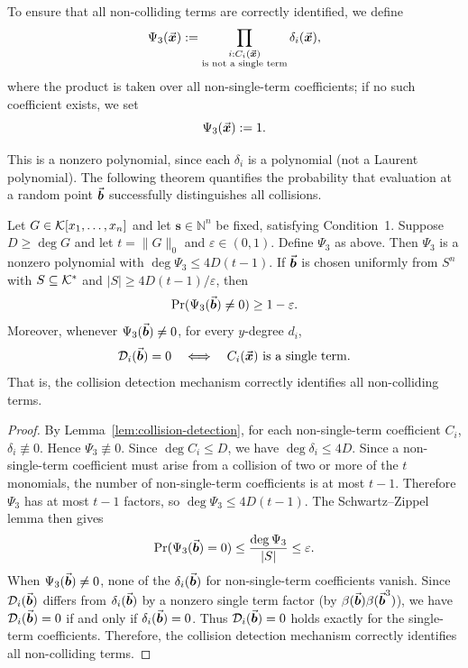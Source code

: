 \documentclass{article}
\numberwithin{equation}{section}
\begin{document}
To ensure that all non-colliding terms are correctly identified, we define
\[
\Psi_3(\vec{\boldsymbol{x}}):=
\prod_{\substack{i : C_i(\vec{\boldsymbol{x}}) \\ \text{is not a single term}}} \delta_i(\vec{\boldsymbol{x}}),
\]
where the product is taken over all non-single-term coefficients; if no such coefficient exists, we set $$\Psi_3(\vec{\boldsymbol{x}}) := 1.$$

This is a nonzero polynomial, since each $\delta_i$ is a polynomial (not a Laurent polynomial). The following theorem quantifies the probability that evaluation at a random point $\vec{\boldsymbol{b}}$ successfully distinguishes all collisions.

\begin{theorem}\label{thm:b-condition3}
Let $G \in {\mathcal{K}}[x_1, \dots, x_n]$ and let $\mathbf{s} \in \mathbb{N}^n$ be fixed, satisfying Condition~1. Suppose $D \ge \deg G$ and let $t = \|G\|_0$ and $\varepsilon\in(0,1)$. Define $\Psi_3$ as above. Then $\Psi_3$ is a nonzero polynomial with $\deg \Psi_3 \le 4 D (t-1)$. If $\vec{\boldsymbol{b}}$ is chosen uniformly from $S^n$ with $S \subseteq {\mathcal{K}}^*$ and $|S| \ge 4 D (t-1) / \varepsilon$, then
\[
\Pr(\Psi_3(\vec{\boldsymbol{b}}) \neq 0) \ge 1 - \varepsilon.
\]
Moreover, whenever $\Psi_3(\vec{\boldsymbol{b}}) \neq 0$, for every $y$-degree $d_i$,
\[
\mathcal{D}_i(\vec{\boldsymbol{b}}) = 0 \quad \Longleftrightarrow \quad C_i(\vec{\boldsymbol{x}}) \text{ is a single term}.
\]
That is, the collision detection mechanism correctly identifies all non-colliding terms.
\end{theorem}

\begin{proof}
By Lemma~\ref{lem:collision-detection}, for each non-single-term coefficient $C_i$, $\delta_i \not\equiv 0$. Hence $\Psi_3 \not\equiv 0$. Since $\deg C_i \le D$, we have $\deg \delta_i \le 4D$. 
%
Since a non-single-term coefficient must arise from a collision of two or more of the $t$ monomials, the number of non-single-term coefficients is at most $t-1$. Therefore $\Psi_3$ has at most $t-1$ factors, so $\deg \Psi_3 \le 4D(t-1)$.
%
The Schwartz--Zippel lemma then gives
\[
\Pr(\Psi_3(\vec{\boldsymbol{b}}) = 0) \le \frac{\deg \Psi_3}{|S|} \le \varepsilon.
\]
When $\Psi_3(\vec{\boldsymbol{b}}) \neq 0$, none of the $\delta_i(\vec{\boldsymbol{b}})$ for non-single-term coefficients vanish. Since $\mathcal{D}_i(\vec{\boldsymbol{b}})$ differs from $\delta_i(\vec{\boldsymbol{b}})$ by a nonzero single term factor (by $\beta(\vec{\boldsymbol{b}})\beta(\vec{\boldsymbol{b}}^3)$), we have $\mathcal{D}_i(\vec{\boldsymbol{b}}) = 0$ if and only if $\delta_i(\vec{\boldsymbol{b}}) = 0$. Thus $\mathcal{D}_i(\vec{\boldsymbol{b}}) = 0$ holds exactly for the single-term coefficients. Therefore, the collision detection mechanism correctly identifies all non-colliding terms.
\end{proof}
\end{document}
